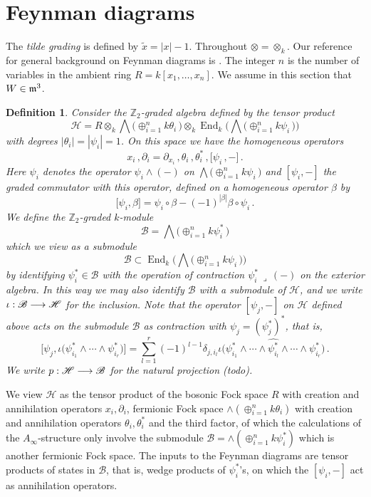 \documentclass[english,letter paper,12pt,leqno]{article}
\theoremstyle{example}
\newtheorem{definition}[theorem]{Definition}
\numberwithin{equation}{section}
\def\be{\begin{equation}}
\def\ee{\end{equation}}
\def\nZ{\mathds{Z}}
\DeclareMathOperator{\End}{End}
\begin{document}
\section{Feynman diagrams}

The \emph{tilde grading} is defined by $\widetilde{x} = |x| - 1$. Throughout $\otimes = \otimes_k$. Our reference for general background on Feynman diagrams is \cite[Ch. 6]{weinberg}. The integer $n$ is the number of variables in the ambient ring $R = k[x_1,\ldots,x_n]$. We assume in this section that $W \in \mathfrak{m}^3$.

\begin{definition} Consider the $\nZ_2$-graded algebra defined by the tensor product
\[
\mathscr{H} = R \otimes_k \bigwedge\big( \oplus_{i=1}^n k \theta_i \,\big) \otimes_k \End_k\Big( \bigwedge\big( \oplus_{i=1}^n k \psi_i \, \big) \Big)
\]
with degrees $|\theta_i| = |\psi_i| = 1$. On this space we have the homogeneous operators
\[
x_i\,, \partial_i = \partial_{x_i}\,, \theta_i\,, \theta_i^*\,, \big[\psi_i\,,-\big]\,.
\]
Here $\psi_i$ denotes the operator $\psi_i \wedge (-)$ on $\bigwedge\big( \oplus_{i=1}^n k \psi_i \, \big)$ and $[ \psi_i, - ]$ the graded commutator with this operator, defined on a homogeneous operator $\beta$ by
\[
\big[ \psi_i, \beta \big] = \psi_i \circ \beta - (-1)^{|\beta|} \beta \circ \psi_i\,.
\]
We define the $\nZ_2$-graded $k$-module
\be\label{defn:B}
\mathscr{B} = \bigwedge\big( \oplus_{i=1}^n k \psi_i^* \,\big)
\ee
which we view as a submodule
\[
\mathscr{B} \subset \End_k\Big( \bigwedge\big( \oplus_{i=1}^n k \psi_i \, \big) \Big)
\]
by identifying $\psi_i^* \in \mathscr{B}$ with the operation of contraction $\psi_i^*\, \lrcorner\, (-)$ on the exterior algebra. In this way we may also identify $\mathscr{B}$ with a submodule of $\mathscr{H}$, and we write $\iota: \mathscr{B} \longrightarrow \mathscr{H}$ for the inclusion. Note that the operator $[\psi_j, -]$ on $\mathscr{H}$ defined above acts on the submodule $\mathscr{B}$ as contraction with $\psi_j = (\psi_j^*)^*$, that is,
\be\label{eq:comm_is_ann}
\Big[ \psi_j, \iota\big(\psi_{i_1}^* \wedge \cdots \wedge \psi_{i_r}^*\big) \Big] = \sum_{l=1}^r (-1)^{l-1} \delta_{j, i_l} \iota\big(\psi_{i_1}^* \wedge \cdots \wedge \widehat{ \psi_{i_l}^* } \wedge \cdots \wedge \psi_{i_r}^*\big)\,.
\ee
We write $p: \mathscr{H} \longrightarrow \mathscr{B}$ for the natural projection (todo).
\end{definition}

We view $\mathscr{H}$ as the tensor product of the bosonic Fock space $R$ with creation and annihilation operators $x_i, \partial_i$, fermionic Fock space $\wedge( \oplus_{i=1}^n k \theta_i )$ with creation and annihilation operators $\theta_i, \theta_i^*$ and the third factor, of which the calculations of the $A_\infty$-structure only involve the submodule $\mathscr{B} = \wedge( \oplus_{i=1}^n k \psi_i^* )$ which is another fermionic Fock space. The inputs to the Feynman diagrams are tensor products of states in $\mathscr{B}$, that is, wedge products of $\psi_i^*$'s, on which the $[\psi_i, -]$ act as annihilation operators.
\end{document}

